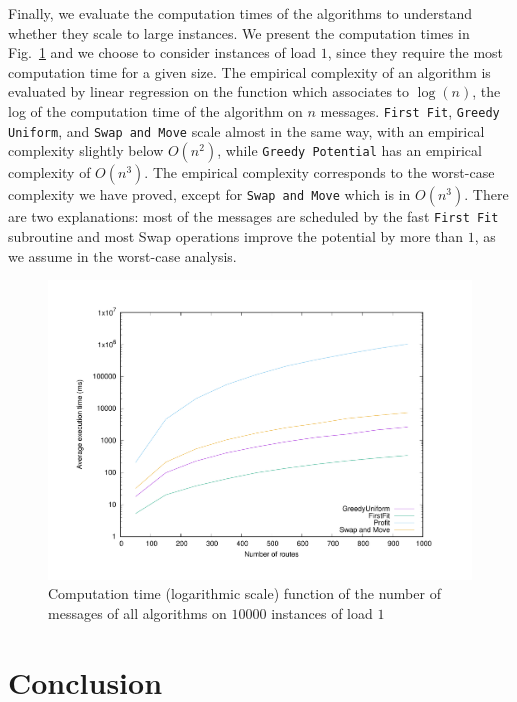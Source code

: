 \documentclass[a4paper,UKenglish,cleveref, autoref, thm-restate]{lipics-v2019}
\newcommand\firstfit{\texttt{First Fit}\xspace}
\newcommand\greedyuniform{\texttt{Greedy Uniform}\xspace}
\newcommand\swapandmove{\texttt{Swap and Move}\xspace}
\newcommand\greedypotential{\texttt{Greedy Potential}\xspace}
\begin{document}
 \medskip
 Finally, we evaluate the computation times of the algorithms to understand whether they scale to large instances. We present the computation times in Fig.~\ref{fig:timelog} and we choose to consider instances of load $1$, since they require the most computation time for a given size. The empirical complexity of an algorithm is evaluated by
 linear regression on the function which associates to $\log(n)$, the log of the computation time of the algorithm on $n$ messages.  \firstfit, \greedyuniform, and \swapandmove scale almost in the same way, with an empirical complexity slightly below $O(n^2)$, while \greedypotential has an empirical complexity of $O(n^3)$. The empirical complexity corresponds to the worst-case complexity we have proved, except for \swapandmove which is in $O(n^3)$. There are two explanations: most of the messages are scheduled by the fast \firstfit subroutine and most Swap operations improve the potential by more than $1$, as we assume in the worst-case analysis.

\begin{figure}
 \begin{center}
\includegraphics[scale=0.275]{log}
\end{center}
\caption{Computation time (logarithmic scale) function of the number of messages of all algorithms on $10000$ instances of load $1$}
\label{fig:timelog}
\end{figure}


 
\section{Conclusion}
\end{document}
